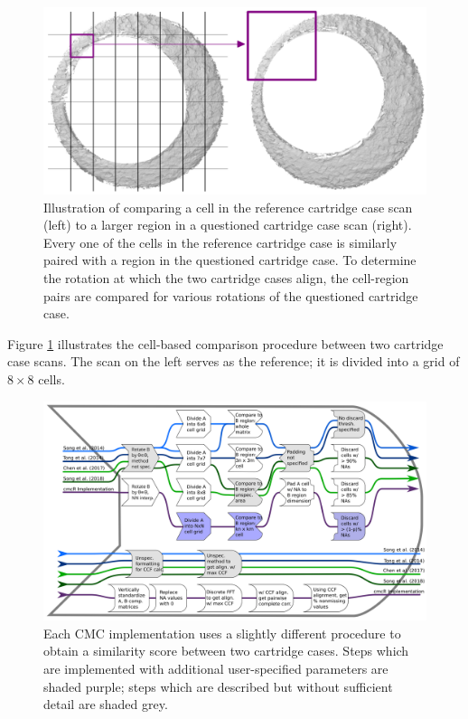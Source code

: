 \begin{figure}[htbp]

{\centering \includegraphics[width=.75\textwidth]{images/cmc_illustration} 

}

\caption{Illustration of comparing a cell in the reference cartridge case scan (left) to a larger region in a questioned cartridge case scan (right). Every one of the cells in the reference cartridge case is similarly paired with a region in the questioned cartridge case.  To determine the rotation at which the two cartridge cases align, the cell-region pairs are compared for various rotations of the questioned cartridge case.}\label{fig:cmc-illustration}
\end{figure}

Figure \ref{fig:cmc-illustration} illustrates the cell-based comparison procedure between two cartridge case scans.
The scan on the left serves as the reference; it is divided into a grid of \(8 \times 8\) cells.

\begin{figure}
\includegraphics[width=\textwidth]{images/cmc_flow} \caption{Each CMC implementation uses a slightly different procedure to obtain a similarity score between two cartridge cases. Steps which are implemented with additional user-specified parameters are shaded purple; steps which are described but without sufficient detail are shaded grey.}\label{fig:cmc-schematic}
\end{figure}


